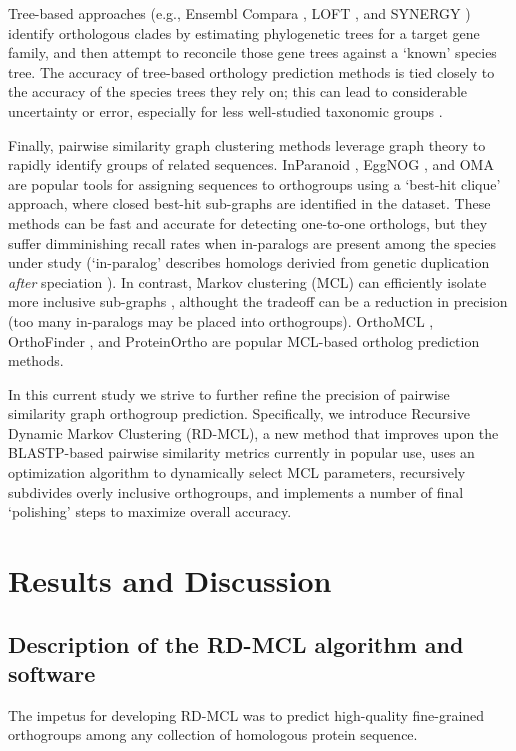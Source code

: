 \documentclass[twocolumn]{bmcart}%
\begin{document}
Tree-based approaches (e.g., Ensembl Compara \cite{Vilella:2009ju}, LOFT \cite{vanderHeijden:2007bo}, and SYNERGY \cite{Wapinski:2007fa}) identify orthologous clades by estimating phylogenetic trees for a target gene family, and then attempt to reconcile those gene trees against a `known' species tree.
The accuracy of tree-based orthology prediction methods is tied closely to the accuracy of the species trees they rely on; this can lead to considerable uncertainty or error, especially for less well-studied taxonomic groups \cite{Xu:2016ek}.

Finally, pairwise similarity graph clustering methods leverage graph theory to rapidly identify groups of related sequences.
InParanoid \cite{OBrien:2005cy}, EggNOG \cite{Jensen:2007cc}, and OMA \cite{Roth:2009iu} are popular tools for assigning sequences to orthogroups using a `best-hit clique' approach, where closed best-hit sub-graphs are identified in the dataset.
These methods can be fast and accurate for detecting one-to-one orthologs, but they suffer dimminishing recall rates when in-paralogs are present among the species under study \cite{Dalquen:2013fz} (`in-paralog' describes homologs derivied from genetic duplication \textit{after} speciation \cite{Sonnhammer:2002vm,Tekaia:2016ga}).
In contrast, Markov clustering (MCL) can efficiently isolate more inclusive sub-graphs \cite{VanDongen:kJZ890qx,Enright:2002uq}, althought the tradeoff can be a reduction in precision (too many in-paralogs may be placed into orthogroups).
OrthoMCL \cite{Li:2003en}, OrthoFinder \cite{Emms:2015ig}, and ProteinOrtho \cite{Lechner:2011jk} are popular MCL-based ortholog prediction methods.

In this current study we strive to further refine the precision of pairwise similarity graph orthogroup prediction.
Specifically, we introduce Recursive Dynamic Markov Clustering (RD-MCL), a new method that improves upon the BLASTP-based pairwise similarity metrics currently in popular use, uses an optimization algorithm to dynamically select MCL parameters, recursively subdivides overly inclusive orthogroups, and implements a number of final `polishing' steps to maximize overall accuracy.




\section{Results and Discussion}
\subsection{Description of the RD-MCL algorithm and software}
The impetus for developing RD-MCL was to predict high-quality fine-grained orthogroups among any collection of homologous protein sequence.
\end{document}
